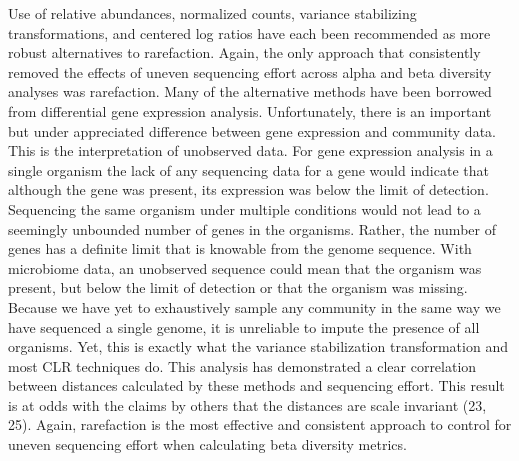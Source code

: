 \documentclass[
]{article}
\begin{document}
Use of relative abundances, normalized counts, variance stabilizing
transformations, and centered log ratios have each been recommended as
more robust alternatives to rarefaction. Again, the only approach that
consistently removed the effects of uneven sequencing effort across
alpha and beta diversity analyses was rarefaction. Many of the
alternative methods have been borrowed from differential gene expression
analysis. Unfortunately, there is an important but under appreciated
difference between gene expression and community data. This is the
interpretation of unobserved data. For gene expression analysis in a
single organism the lack of any sequencing data for a gene would
indicate that although the gene was present, its expression was below
the limit of detection. Sequencing the same organism under multiple
conditions would not lead to a seemingly unbounded number of genes in
the organisms. Rather, the number of genes has a definite limit that is
knowable from the genome sequence. With microbiome data, an unobserved
sequence could mean that the organism was present, but below the limit
of detection or that the organism was missing. Because we have yet to
exhaustively sample any community in the same way we have sequenced a
single genome, it is unreliable to impute the presence of all organisms.
Yet, this is exactly what the variance stabilization transformation and
most CLR techniques do. This analysis has demonstrated a clear
correlation between distances calculated by these methods and sequencing
effort. This result is at odds with the claims by others that the
distances are scale invariant (23, 25). Again, rarefaction is the most
effective and consistent approach to control for uneven sequencing
effort when calculating beta diversity metrics.
\end{document}
